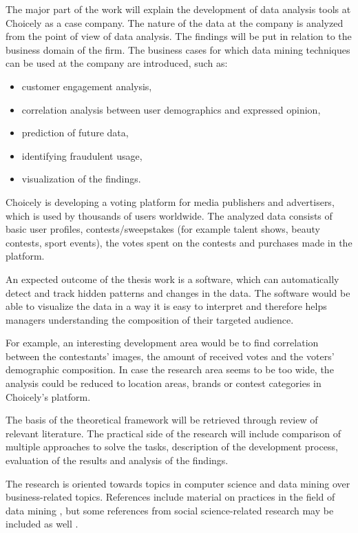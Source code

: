 \documentclass[english]{tktltiki}
\begin{document}
	The major part of the work will explain the development of data analysis tools at Choicely as a case company. The nature of the data at the company is analyzed from the point of view of data analysis. The findings will be put in relation to the business domain of the firm. The business cases for which data mining techniques can be used at the company are introduced, such as:  
	
	\begin{itemize}
		\item customer engagement analysis,
		\item correlation analysis between user demographics and expressed opinion, 
		\item prediction of future data,
		\item identifying fraudulent usage, 
		\item visualization of the findings.
	\end{itemize}
	
	Choicely is developing a voting platform for media publishers and advertisers, which is used by thousands of users worldwide. The analyzed data consists of basic user profiles, contests/sweepstakes (for example talent shows, beauty contests, sport events), the votes spent on the contests and purchases made in the platform. 
		
	An expected outcome of the thesis work is a software, which can automatically detect and track hidden patterns and changes in the data. The software would be able to visualize the data in a way it is easy to interpret and therefore helps managers understanding the composition of their targeted audience. 
		
	For example, an interesting development area would be to find correlation between the contestants' images, the amount of received votes and the voters' demographic composition. In case the research area seems to be too wide, the analysis could be reduced to location areas, brands or contest categories in Choicely's platform. 
	
    The basis of the theoretical framework will be retrieved through review of relevant literature. The practical side of the research will include comparison of multiple approaches to solve the tasks, description of the development process, evaluation of the results and analysis of the findings. 
        
    The research is oriented towards topics in computer science and data mining over business-related topics. References include material on practices in the field of data mining \cite{witten2016data, introtodatamining, inmon2007tapping, zarsky2002mine, bose2001business, data_mining_and_knowledge_discovery, monetisingusergeneratedcontent, datamininginbusinessprocesses, data_mining_in_educational_science}, but some references from social science-related research may be included as well \cite{kahneman1982psychology, pang2008opinion}.
    
\end{document}
